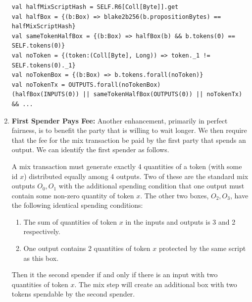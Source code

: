 \documentclass[11pt]{article}
\begin{document}
\begin{enumerate}
\begin{verbatim}
val halfMixScriptHash = SELF.R6[Coll[Byte]].get
val halfBox = {(b:Box) => blake2b256(b.propositionBytes) == halfMixScriptHash}
val sameTokenHalfBox = {(b:Box) => halfBox(b) && b.tokens(0) == SELF.tokens(0)}
val noToken = {(token:(Coll[Byte], Long)) => token._1 != SELF.tokens(0)._1}
val noTokenBox = {(b:Box) => b.tokens.forall(noToken)}
val noTokenTx = OUTPUTS.forall(noTokenBox)
(halfBox(INPUTS(0)) || sameTokenHalfBox(OUTPUTS(0)) || noTokenTx) && ...
\end{verbatim}
\item \textbf{First Spender Pays Fee:} Another enhancement, primarily in perfect fairness, is to benefit the party that is willing to wait longer. We then require that the fee for the mix transaction be paid by the first party that spends an output. We can identify the first spender as follows. 

A mix transaction must generate exactly 4 quantities of a token (with some id $x$) distributed equally among 4 outputs. Two of these are the standard mix outputs $O_0, O_1$ with the additional spending condition that one output must contain some non-zero quantity of token $x$. The other two boxes, $O_2, O_3$, have the following identical spending conditions:
\begin{enumerate}
	\item The sum of quantities of token $x$ in the inputs and outputs is 3 and 2 respectively.
	\item One output contains 2 quantities of token $x$ protected by the same script as this box. 
\end{enumerate}

Then it the second spender if and only if there is an input with two quantities of token $x$. 
The mix step will create an additional box with two tokens spendable by the second spender.
\end{enumerate}

 
\end{document}
